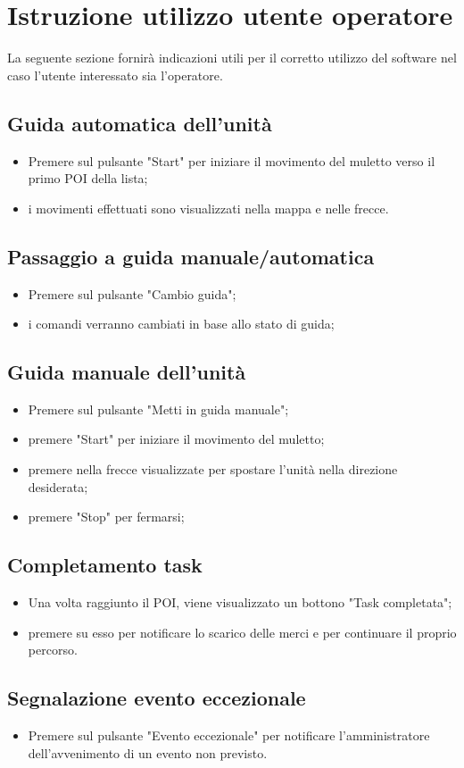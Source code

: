 \section{Istruzione utilizzo utente operatore}

La seguente sezione fornirà indicazioni utili per il corretto utilizzo del software nel caso l'utente interessato sia l'operatore.
\subsection{Guida automatica dell'unità}
\begin{itemize}
    \item Premere sul pulsante "Start" per iniziare il movimento del muletto verso il primo POI della lista;
    \item i movimenti effettuati sono visualizzati nella mappa e nelle frecce.
\end{itemize}
\subsection{Passaggio a guida manuale/automatica}
\begin{itemize}
    \item Premere sul pulsante "Cambio guida";
    \item i comandi verranno cambiati in base allo stato di guida;
\end{itemize}
\subsection{Guida manuale dell'unità}
\begin{itemize}
    \item Premere sul pulsante "Metti in guida manuale";
    \item premere "Start" per iniziare il movimento del muletto;
    \item premere nella frecce visualizzate per spostare l'unità nella direzione desiderata;
    \item premere "Stop" per fermarsi;
\end{itemize}
\subsection{Completamento task}
\begin{itemize}
    \item Una volta raggiunto il POI, viene visualizzato un bottono "Task completata";
    \item premere su esso per notificare lo scarico delle merci e per continuare il proprio percorso.
\end{itemize}

\subsection{Segnalazione evento eccezionale}
\begin{itemize}
    \item Premere sul pulsante "Evento eccezionale" per notificare l'amministratore dell'avvenimento di un evento non previsto.
\end{itemize}